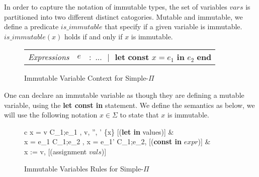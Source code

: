 \documentclass[a4paper,12pt]{report}
\begin{document}
\par
In order to capture the notation of immutable types, the set of variables $vars$ 
is partitioned into two different distinct catogories. Mutable and immutable, we 
define a predicate $is\_immutable$ that specify if a given variable is immutable. 
$is\_immutable(x)$ holds if and only if $x$ is immutable. 

\begin{figure}[H]
  \begin{center}
    \begin{tabular} {l l l}
      \textit{Expressions} & $e$& $:$ $...\text{ }|\text{ }
        \textbf{let const }x = e_1 \textbf{ in }e_2\textbf{ end}$
    \end{tabular}
  \end{center}
  \caption{Immutable Variable Context for Simple-$\Pi$}
\end{figure}
 
One can declare an immutable variable as though they are defining a mutable 
variable, using the \textbf{let const in} statement. We define the semantics as 
below, we will use the following notation $x \in \Sigma$ to state that $x$ is 
immutable.

\begin{figure}[H]
  \begin{center}
    \begin{tabular}{c}
      {\langle {}x = v  C_1;e_1 , \sigma \rangle 
      \Longrightarrow \langle v, \sigma'', \tau' \setminus \{x\} \rangle} [(\textbf{let in} values)] 
      & \\
      {\langle {}x = e_1  C_1;e_2 , \sigma \rangle 
      \Longrightarrow \langle {}x = e_1'  C_1;e_2, \sigma \rangle} 
      [(\textbf{const in} $expr$)]
      & \\
      {\langle x := v, \sigma \rangle \longrightarrow \sigma[x \mapsto v]} [(assignment $vals$)] \text{ }
    \end{tabular}
  \end{center}
  \caption{Immutable Variables Rules for Simple-$\Pi$}
\end{figure}
\end{document}
